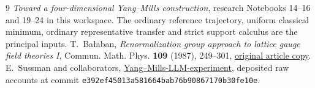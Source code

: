 
\begin{thebibliography}{9}
\emph{Toward a four-dimensional Yang--Mills construction},
research Notebooks 14--16 and 19--24 in this workspace.
The ordinary reference trajectory, uniform classical minimum,
ordinary representative transfer and strict support calculus
are the principal inputs.
T.~Ba\l aban,
\emph{Renormalization group approach to lattice gauge field
theories I}, Commun. Math. Phys. \textbf{109} (1987), 249--301,
\href{https://scispace.com/pdf/renormalization-group-approach-to-lattice-gauge-field-3ygai0vxt1.pdf}{original article copy}.
E.~Sussman and collaborators,
\href{https://github.com/ethanwsussman/Yang--Mills-LLM-experiment}{Yang--Mills-LLM-experiment},
deposited raw accounts at commit
\texttt{e392ef45013a581664bab76b90867170b30fe10e}.
\end{thebibliography}

